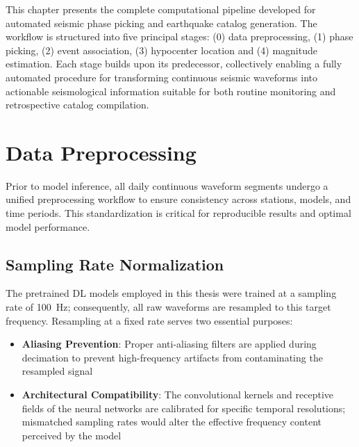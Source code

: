 \label{chap:Pipeline}

This chapter presents the complete computational pipeline developed for
automated seismic phase picking and earthquake catalog generation. The workflow
is structured into five principal stages: (0) data preprocessing, (1) phase
picking, (2) event association, (3) hypocenter location and (4) magnitude
estimation. Each stage builds upon its predecessor, collectively enabling a
fully automated procedure for transforming continuous seismic waveforms into
actionable seismological information suitable for both routine monitoring and
retrospective catalog compilation.

\section{Data Preprocessing}

Prior to model inference, all daily continuous waveform segments undergo a
unified preprocessing workflow to ensure consistency across stations, models,
and time periods. This standardization is critical for reproducible results
and optimal model performance.

\subsection{Sampling Rate Normalization}
The pretrained \ac{DL} models employed in this thesis were trained at a
sampling rate of 100~Hz; consequently, all raw waveforms are resampled to this
target frequency. Resampling at a fixed rate serves two essential purposes:
\begin{itemize}
  \item \textbf{Aliasing Prevention}: Proper anti-aliasing filters are applied
    during decimation to prevent high-frequency artifacts from
    contaminating the
    resampled signal
  \item \textbf{Architectural Compatibility}: The convolutional kernels and
    receptive fields of the neural networks are calibrated for
    specific temporal
    resolutions; mismatched sampling rates would alter the effective frequency
    content perceived by the model
\end{itemize}

